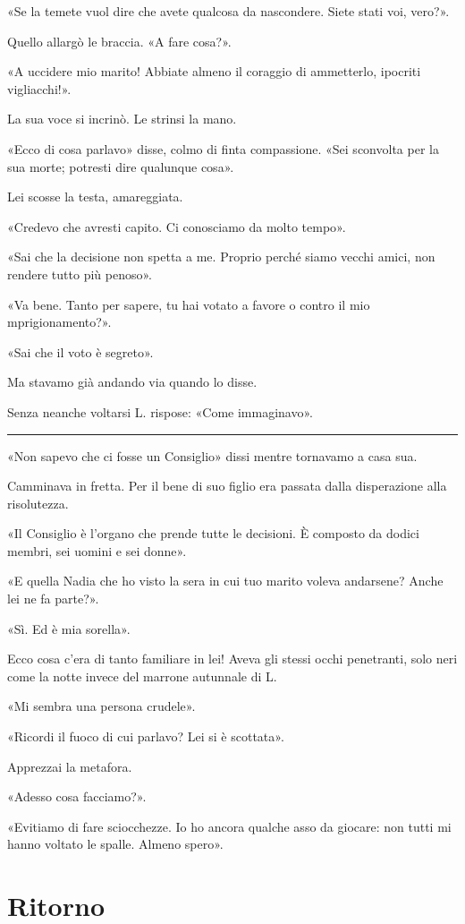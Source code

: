 \documentclass[a4paper,11pt,oneside,openright,final]{memoir}
\begin{document}
«Se la temete vuol dire che avete qualcosa da nascondere. Siete stati voi,
vero?».

Quello allargò le braccia. «A fare cosa?».

«A uccidere mio marito! Abbiate almeno il coraggio di ammetterlo, ipocriti
vigliacchi!».

La sua voce si incrinò. Le strinsi la mano.

«Ecco di cosa parlavo» disse, colmo di finta compassione. «Sei sconvolta per la
sua morte; potresti dire qualunque cosa».

Lei scosse la testa, amareggiata.

«Credevo che avresti capito. Ci conosciamo da molto tempo».

«Sai che la decisione non spetta a me. Proprio perché siamo vecchi amici, non
rendere tutto più penoso».

«Va bene. Tanto per sapere, tu hai votato a favore o contro il mio
mprigionamento?».

«Sai che il voto è segreto».

Ma stavamo già andando via quando lo disse.

Senza neanche voltarsi L. rispose: «Come immaginavo».

\plainbreak{1}

«Non sapevo che ci fosse un Consiglio» dissi mentre tornavamo a casa sua.

Camminava in fretta. Per il bene di suo figlio era passata dalla disperazione
alla risolutezza.

«Il Consiglio è l'organo che prende tutte le decisioni. È composto da dodici
membri, sei uomini e sei donne».

«E quella Nadia che ho visto la sera in cui tuo marito voleva andarsene? Anche
lei ne fa parte?».

«Sì. Ed è mia sorella».

Ecco cosa c'era di tanto familiare in lei! Aveva gli stessi occhi penetranti,
solo neri come la notte invece del marrone autunnale di L.

«Mi sembra una persona crudele».

«Ricordi il fuoco di cui parlavo? Lei si è scottata».

Apprezzai la metafora.

«Adesso cosa facciamo?».

«Evitiamo di fare sciocchezze. Io ho ancora qualche asso da giocare: non tutti
mi hanno voltato le spalle. Almeno spero».

\chapter{Ritorno}
\end{document}
